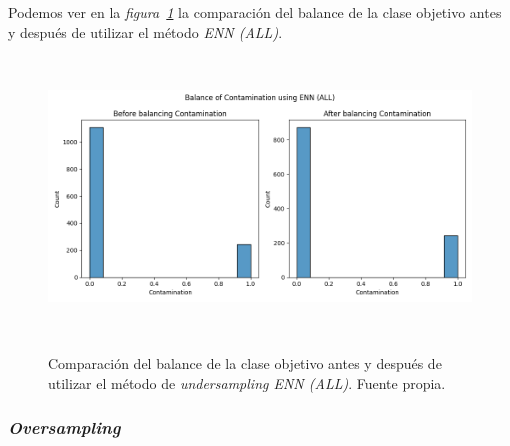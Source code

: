 Podemos ver en la \textit{figura\ \ref{fig:balance-enn}} la comparación del balance de la clase objetivo antes y después de utilizar el método \textit{ENN (ALL)}. 

\begin{table}[!ht]
    \caption{Resultado de entrenar los modelos básicos sobre el \textit{dataset} reducido con los diferentes métodos. Fuente: propia.}\ \label{tab:undersampling-methods}
\end{table}

\begin{figure}[!ht]
    \centering
    \includegraphics[width=0.8\linewidth]{media/images/balance.png}
    \caption{Comparación del balance de la clase objetivo antes y después de utilizar el método de \textit{undersampling ENN (ALL)}. Fuente propia.}\ \label{fig:balance-enn}
\end{figure}

\clearpage

\subsubsection{\textit{Oversampling}}


